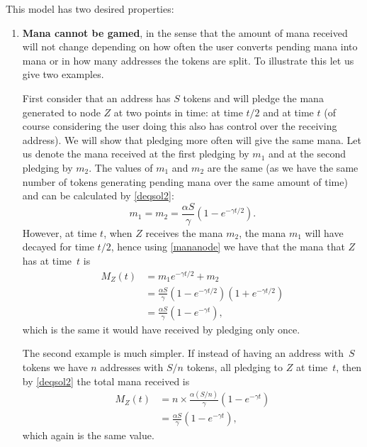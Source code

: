 \documentclass[../main.tex]{subfiles}
\begin{document}
This model has two desired properties:
\begin{enumerate}
    \item \textbf{Mana cannot be gamed}, in the sense that the amount of mana received will not change depending on how often the user converts pending mana into mana or in how many addresses the tokens are split. To illustrate this let us give two examples.
    
    First consider that an address has $S$ tokens and will pledge the mana  generated to node $Z$ at two points in time: at time $t/2$ and at time $t$ (of course considering the user doing this also has control over the receiving address). We will show that pledging more often will give the same mana. Let us denote the mana received at the first pledging by $m_1$  and at the second pledging by $m_2$. The values of $m_1$ and $m_2$ are the same (as we have the same number of tokens generating pending mana over the same amount of time) and can be calculated by \eqref{deqsol2}:
    \[
    m_1=m_2=\frac{\alpha S}{\gamma}(1-e^{-\gamma t/2}).
    \]
    However, at time $t$, when $Z$ receives the mana $m_2$, the mana $m_1$ will have decayed for time $t/2$, hence using \eqref{mananode} we have that the mana that $Z$ has at time~$t$  is 
    \begin{align*}
    M_Z(t)&=m_1e^{-\gamma t/2}+m_2\\
    &=\frac{\alpha S}{\gamma}(1-e^{-\gamma t/2})(1+e^{-\gamma t/2})\\
    &=\frac{\alpha S}{\gamma}(1-e^{-\gamma t}),
    \end{align*}
    which is the same it would have received by pledging only once. 
    
    The second example is much simpler. If instead of having an address with~$S$ tokens we have $n$ addresses with $S/n$ tokens, 
    all pledging to $Z$ at time~$t$, then by \eqref{deqsol2} the total mana received is
    \begin{align*}
    M_Z(t)&=n\times \frac{\alpha (S/n)}{\gamma}(1-e^{-\gamma t})\\
    &=\frac{\alpha S}{\gamma}(1-e^{-\gamma t}),
    \end{align*}
    which again is the same value.
    

\end{enumerate}
\end{document}
